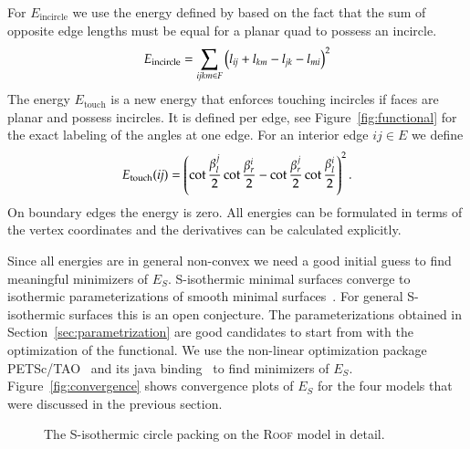 \documentclass[Thesis.tex]{subfiles}
\begin{document}
For $E_{\mathrm{incircle}}$ we use the energy defined by
\cite{SchiftnerHWP2009} based on the fact that the sum of opposite edge
lengths must be equal for a planar quad to possess an incircle.
\begin{equation}
E_{\mathrm{incircle}} = \sum_{\mathrm{\it{ijkm}} \in F} \left( l_{\mathrm{\it{ij}}} + 
l_{\mathrm{\it{km}}} - l_{\mathrm{\it{jk}}} - l_{\mathrm{\it{mi}}} \right)^2
\end{equation}
The energy
$E_{\mathrm{touch}}$ is a new energy that enforces touching incircles
if faces are planar and possess incircles.  It is defined per edge, see
Figure~\ref{fig:functional} for the exact labeling of the angles at one edge.
For an interior edge $ij\in E$ we define
\begin{equation}
  E_{\mathrm{touch}}(\mathrm{\it{ij}})=
  \left(\cot\frac{\beta^j_l}{2}\cot\frac{\beta^i_r}{2} - 
\cot\frac{\beta^j_r}{2}\cot\frac{\beta^i_l}{2}\right)^2.
\end{equation}
On boundary edges the energy is zero. All energies can be formulated 
in terms of the vertex coordinates and the derivatives can be calculated explicitly.

Since all energies are in general non-convex we need a good initial guess to 
find meaningful minimizers of $E_S$.
S-isothermic minimal surfaces converge to isothermic parameterizations of
smooth minimal surfaces~\cite{BobHofSpr06}. For general S-isothermic surfaces
this is an open conjecture. The parameterizations obtained in
Section~\ref{sec:parametrization} are good candidates to start from with the
optimization of the functional.
We use the non-linear optimization package PETSc/TAO~\cite{petsc-web-page,
tao-user-ref} and its java binding~\cite{jpetsctao-web-page} to find
minimizers of $E_S$. Figure~\ref{fig:convergence} shows convergence plots of
$E_S$ for the four models that were discussed in the previous section.
\begin{figure}
\centering
{}
\caption{The S-isothermic circle packing on the \textsc{Roof} model in detail.}
\end{figure}
\end{document}
